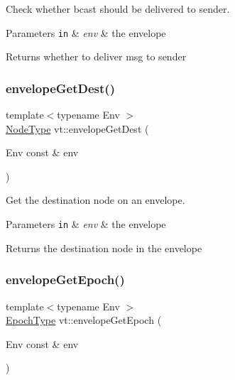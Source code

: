 Check whether bcast should be delivered to sender. 


\begin{DoxyParams}[1]{Parameters}
\mbox{\tt in}  & {\em env} & the envelope\\
\hline
\end{DoxyParams}
\begin{DoxyReturn}{Returns}
whether to deliver msg to sender 
\end{DoxyReturn}
\mbox{\label{namespacevt_a99cdbbb47f13203e14b01fa43bca99e9}} 
\subsubsection{\texorpdfstring{envelope\+Get\+Dest()}{envelopeGetDest()}}
{\footnotesize\ttfamily template$<$typename Env $>$ \\
\hyperlink{namespacevt_a866da9d0efc19c0a1ce79e9e492f47e2}{Node\+Type} vt\+::envelope\+Get\+Dest (\begin{DoxyParamCaption}\item[{Env const \&}]{env }\end{DoxyParamCaption})\hspace{0.3cm}{\ttfamily [inline]}}



Get the destination node on an envelope. 


\begin{DoxyParams}[1]{Parameters}
\mbox{\tt in}  & {\em env} & the envelope\\
\hline
\end{DoxyParams}
\begin{DoxyReturn}{Returns}
the destination node in the envelope 
\end{DoxyReturn}
\mbox{\label{namespacevt_ad5495e7900227550b44837e899c5bb13}} 
\subsubsection{\texorpdfstring{envelope\+Get\+Epoch()}{envelopeGetEpoch()}}
{\footnotesize\ttfamily template$<$typename Env $>$ \\
\hyperlink{namespacevt_a985a5adf291c34a3ca263b3378388236}{Epoch\+Type} vt\+::envelope\+Get\+Epoch (\begin{DoxyParamCaption}\item[{Env const \&}]{env }\end{DoxyParamCaption})\hspace{0.3cm}{\ttfamily [inline]}}



